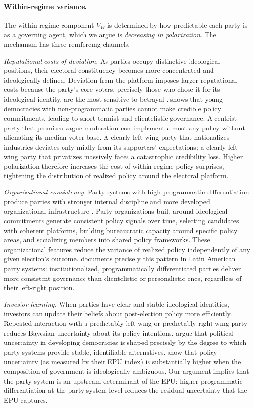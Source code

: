 \documentclass[12pt]{article}
\begin{document}
\paragraph{Within-regime variance.} The within-regime component $V_W$
is determined by how predictable each party is as a governing agent, which
we argue is \textit{decreasing in polarization}. The mechanism has three
reinforcing channels.

\textit{Reputational costs of deviation.} As parties occupy distinctive
ideological positions, their electoral constituency becomes more concentrated
and ideologically defined. Deviation from the platform imposes larger
reputational costs because the party's core voters, precisely those who
chose it for its ideological identity, are the most sensitive to betrayal
\citep{PerssTabellini2000}. \citet{Keefer2007} shows that young democracies
with non-programmatic parties cannot make credible policy commitments,
leading to short-termist and clientelistic governance. A centrist party
that promises vague moderation can implement almost any policy without
alienating its median-voter base.
A clearly left-wing party that nationalizes industries deviates only mildly
from its supporters' expectations; a clearly left-wing party that privatizes
massively faces a catastrophic credibility loss. Higher polarization
therefore increases the cost of within-regime policy surprises, tightening
the distribution of realized policy around the electoral platform.

\textit{Organizational consistency.} Party systems with high programmatic
differentiation produce parties with stronger internal discipline and more
developed organizational infrastructure \citep{MainwaringScully1995,
KitscheltKselman2013}. Party
organizations built around ideological commitments generate consistent policy
signals over time, selecting candidates with coherent platforms, building
bureaucratic capacity around specific policy areas, and socializing members
into shared policy frameworks. These organizational features reduce the
variance of realized policy independently of any given election's outcome.
\citet{Mainwaring1995} documents precisely this pattern in Latin American
party systems: institutionalized, programmatically differentiated parties
deliver more consistent governance than clientelistic or personalistic ones,
regardless of their left-right position.

\textit{Investor learning.} When parties have clear and stable ideological
identities, investors can update their beliefs about post-election policy
more efficiently. Repeated interaction with a predictably left-wing or
predictably right-wing party reduces Bayesian uncertainty about its
policy intentions. \citet{LupuRiedl2013} argue that political uncertainty
in developing democracies is shaped precisely by the degree to which
party systems provide stable, identifiable alternatives.
\citet{Baker2016} show that policy uncertainty (as
measured by their EPU index) is substantially higher when the
composition of government is ideologically ambiguous. Our argument implies
that the party system is an upstream determinant of the EPU: higher
programmatic differentiation at the party system level reduces the
residual uncertainty that the EPU captures.
\end{document}
